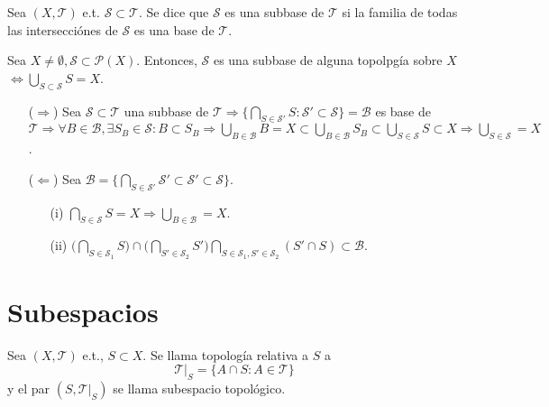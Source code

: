 \begin{defn}[Subbase]
  Sea $( X, \mathcal{T} )$ e.t. $\mathcal{S} \subset \mathcal{T}$. Se dice que $\mathcal{S}$ es una subbase de $\mathcal{T}$ si la familia de todas las intersecciónes de $\mathcal{S}$ es una base de $\mathcal{T}$.
\end{defn}

\begin{prop}
  Sea $X \neq \emptyset, \mathcal{S} \subset \mathcal{P}(X)$. Entonces, $\mathcal{S}$ es una subbase de alguna topolpgía sobre $X$ $\Leftrightarrow \bigcup_{S \subset \mathcal{S}} S = X$.
\end{prop}

\begin{dem}
  \begin{enumerate}[label=(\roman*)]
    \item [($\Rightarrow$)] Sea $\mathcal{S} \subset \mathcal{T}$ una subbase de $\mathcal{T} \Rightarrow \{ \bigcap_{S \in \mathcal{S}' } S : \mathcal{S}' \subset \mathcal{S}  \} = \mathcal{B}$ es base de $\mathcal{T} \Rightarrow \forall B \in \mathcal{B}, \exists S_{B} \in \mathcal{S}: B \subset S_{B} \Rightarrow \bigcup_{B \in \mathcal{B}}B = X \subset \bigcup_{B \in \mathcal{B}} S_{B} \subset \bigcup_{S \in \mathcal{S}} S \subset X \Rightarrow \bigcup_{S \in \mathcal{S}}= X$.
    \item [($\Leftarrow$)] Sea $\mathcal{B} = \{ \bigcap_{S \in \mathcal{S}'} \mathcal{S}' \subset \mathcal{S}' \subset \mathcal{S} \}$.
      \begin{enumerate}[label=(\roman*)]
        \item [(i)] $ \bigcap_{S \in \mathcal{S}} S = X \Rightarrow \bigcup_{B \in \mathcal{B}} = X$.
        \item [(ii)] $\big (  \bigcap_{S \in \mathcal{S}_{1}} S \big ) \cap \big (  \bigcap_{S' \in \mathcal{S}_{2}} S'  \big )  \bigcap_{S \in \mathcal{S}_{1}, S' \in \mathcal{S}_{2}} (S'\cap S) \subset \mathcal{B}$.
      \end{enumerate}
  \end{enumerate}
\end{dem}

\section{Subespacios}

\begin{defn}[Subespacio]
  Sea $( X, \mathcal{T} )$ e.t., $S \subset X$. Se llama topología relativa a $S$ a 
  \[ 
    \mathcal{T}|_{S} = \{ A \cap S : A \in \mathcal{T} \}  
  \] 
  y el par $( S, \mathcal{T}|_{S} )$ se llama subespacio topológico.
\end{defn}

